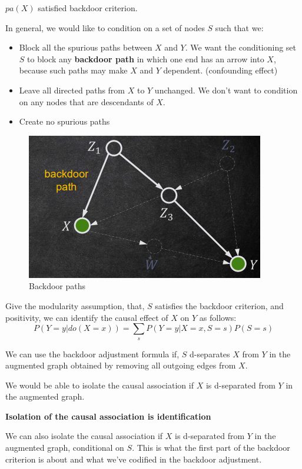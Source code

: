 \begin{note}
      $pa(X)$ satisfied backdoor criterion.
\end{note}

In general, we would like to condition on a set of nodes $S$ such that we:
\begin{itemize}
      \item Block all the spurious paths between $X$ and $Y$. We want the
            conditioning set $S$ to block any \textbf{backdoor path} in which
            one end has an arrow into $X$, because such paths may make $X$ and
            $Y$ dependent. (confounding effect)
      \item Leave all directed paths from $X$ to $Y$ unchanged. We don't want
            to condition on any nodes that are descendants of $X$.
      \item Create no spurious paths
\end{itemize}
\begin{figure}[!ht]
      \centering
      \includegraphics[width=\textwidth]{img/backdoor.png}
      \caption{Backdoor paths}
      \label{fig:backdoor}
\end{figure}
\begin{definition}
      Give the modularity assumption, that, $S$ satisfies the backdoor criterion,
      and positivity, we can identify the causal effect of $X$ on $Y$ as follows:
      \begin{equation}
            P(Y = y| do(X = x)) = \sum_{s} P(Y = y| X = x, S = s)P(S = s)
      \end{equation}
\end{definition}

We can use the backdoor adjustment formula if, $S$ d-separates $X$ from $Y$ in
the augmented graph obtained by removing all outgoing edges from $X$. 

We would be able to isolate the causal association if $X$ is d-separated from 
$Y$ in the augmented graph.
\begin{center}
      \textbf{Isolation of the causal association is identification}
\end{center}

We can also isolate the causal association if $X$ is d-separated from $Y$ in
the augmented graph, conditional on $S$. This is what the first part of the 
backdoor criterion is about and what we've codified in the backdoor adjustment.